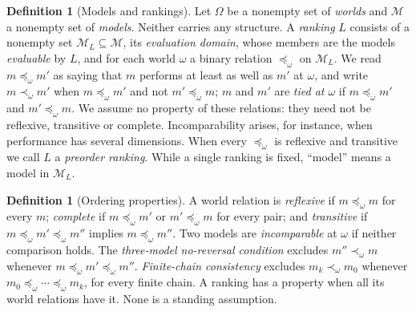 \documentclass[11pt]{article}
\theoremstyle{definition}
\newtheorem{definition}[theorem]{Definition}
\theoremstyle{remark}
\newcommand{\M}{\mathcal M}
\begin{document}
\begin{definition}[Models and rankings]\label{def:rankings}
Let $\Omega$ be a nonempty set of \emph{worlds} and $\M$ a nonempty set of \emph{models}. Neither carries any structure. A \emph{ranking} $L$ consists of a nonempty set $\M_L\subseteq\M$, its \emph{evaluation domain}, whose members are the models \emph{evaluable} by $L$, and for each world $\omega$ a binary relation $\preceq_\omega$ on $\M_L$. We read $m\preceq_\omega m'$ as saying that $m$ performs at least as well as $m'$ at $\omega$, and write $m\prec_\omega m'$ when $m\preceq_\omega m'$ and not $m'\preceq_\omega m$; $m$ and $m'$ are \emph{tied at $\omega$} if $m\preceq_\omega m'$ and $m'\preceq_\omega m$. We assume no property of these relations: they need not be reflexive, transitive or complete. Incomparability arises, for instance, when performance has several dimensions. When every $\preceq_\omega$ is reflexive and transitive we call $L$ a \emph{preorder ranking}. While a single ranking is fixed, ``model'' means a model in $\M_L$.
\end{definition}

\begin{definition}[Ordering properties]\label{def:ordering}
A world relation is \emph{reflexive} if $m\preceq_\omega m$ for every $m$;
\emph{complete} if $m\preceq_\omega m'$ or $m'\preceq_\omega m$ for every pair; and
\emph{transitive} if $m\preceq_\omega m'\preceq_\omega m''$ implies $m\preceq_\omega m''$.
Two models are \emph{incomparable} at $\omega$ if neither comparison holds.
The \emph{three-model no-reversal condition} excludes $m''\prec_\omega m$ whenever
$m\preceq_\omega m'\preceq_\omega m''$.
\emph{Finite-chain consistency} excludes $m_k\prec_\omega m_0$ whenever
$m_0\preceq_\omega\cdots\preceq_\omega m_k$, for every finite chain.
A ranking has a property when all its world relations have it. None is a standing assumption.
\end{definition}
\end{document}
